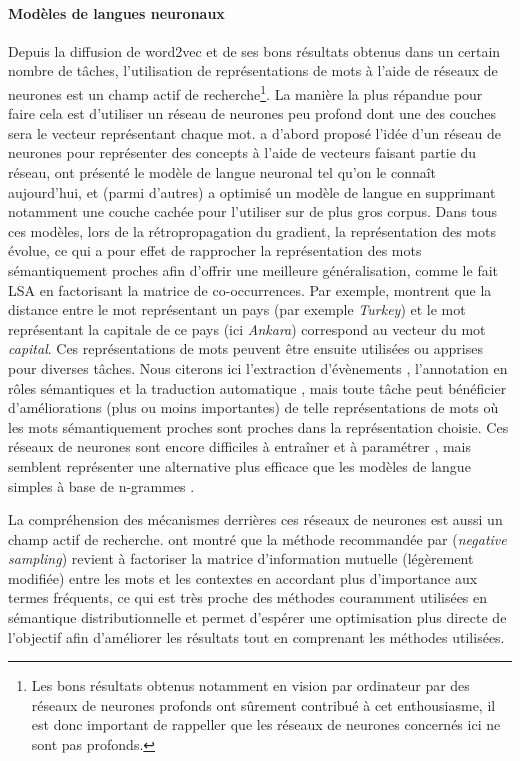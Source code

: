 \paragraph{Modèles de langues neuronaux} Depuis la diffusion de word2vec
\citep{mikolov2013distributed} et de ses bons résultats obtenus dans un certain
nombre de tâches, l'utilisation de représentations de mots à l'aide de réseaux
de neurones est un champ actif de recherche\footnote{Les bons résultats obtenus
notamment en vision par ordinateur par des réseaux de neurones profonds ont
sûrement contribué à cet enthousiasme, il est donc important de rappeller que
les réseaux de neurones concernés ici ne sont pas profonds.}.  La manière la
plus répandue pour faire cela est d'utiliser un réseau de neurones peu profond
dont une des couches sera le vecteur représentant chaque mot.
\cite{hinton1986learning} a d'abord proposé l'idée d'un réseau de neurones pour
représenter des concepts à l'aide de vecteurs faisant partie du réseau,
\cite{bengio2001neural,bengio2003neural} ont présenté le modèle de langue
neuronal tel qu'on le connaît aujourd'hui, et \cite{mikolov2013distributed}
(parmi d'autres) a optimisé un modèle de langue en supprimant notamment une
couche cachée pour l'utiliser sur de plus gros corpus. Dans tous ces modèles,
lors de la rétropropagation du gradient, la représentation des mots évolue, ce
qui a pour effet de rapprocher la représentation des mots sémantiquement
proches afin d'offrir une meilleure généralisation, comme le fait LSA en
factorisant la matrice de co-occurrences.  Par exemple,
\cite{mikolov2013distributed} montrent que la distance entre le mot
représentant un pays (par exemple \textit{Turkey}) et le mot représentant la
capitale de ce pays (ici \textit{Ankara}) correspond au vecteur du mot
\textit{capital}.  Ces représentations de mots peuvent être ensuite utilisées ou
apprises pour diverses tâches. Nous citerons ici l'extraction d'évènements
\citep{boros2014etiquetage}, l'annotation en rôles sémantiques
\citep{lechelle2014utilisation} et la traduction automatique
\citep{devlin2014fast}, mais toute tâche peut bénéficier d'améliorations (plus
ou moins importantes) de telle représentations de mots où les mots
sémantiquement proches sont proches dans la représentation choisie.  Ces
réseaux de neurones sont encore difficiles à entraîner et à paramétrer
\citep{do2014modeles}, mais semblent représenter une alternative plus efficace
que les modèles de langue simples à base de n-grammes \citep{baroni2014dont}.

La compréhension des mécanismes derrières ces réseaux de neurones est aussi un
champ actif de recherche. \cite{levy2014neural} ont montré que la méthode
recommandée par \cite{mikolov2013distributed} (\textit{negative sampling})
revient à factoriser la matrice d'information mutuelle (légèrement modifiée)
entre les mots et les contextes en accordant plus d'importance aux termes
fréquents, ce qui est très proche des méthodes couramment utilisées en
sémantique distributionnelle et permet d'espérer une optimisation plus directe
de l'objectif afin d'améliorer les résultats tout en comprenant les méthodes
utilisées.


